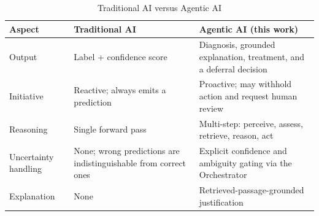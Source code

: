 \documentclass[conference]{IEEEtran}
\begin{document}
\begin{table}[t]
\centering
\caption{Traditional AI versus Agentic AI}
\label{tab:comparison}
\small
\begin{tabular}{p{1.6cm}p{2.7cm}p{2.9cm}}
\toprule
\textbf{Aspect} & \textbf{Traditional AI} & \textbf{Agentic AI (this work)} \\
\midrule
Output & Label + confidence score & Diagnosis, grounded explanation, treatment, and a deferral decision \\
Initiative & Reactive; always emits a prediction & Proactive; may withhold action and request human review \\
Reasoning & Single forward pass & Multi-step: perceive, assess, retrieve, reason, act \\
Uncertainty handling & None; wrong predictions are indistinguishable from correct ones & Explicit confidence and ambiguity gating via the Orchestrator \\
Explanation & None & Retrieved-passage-grounded justification \\
\bottomrule
\end{tabular}
\end{table}
\end{document}
